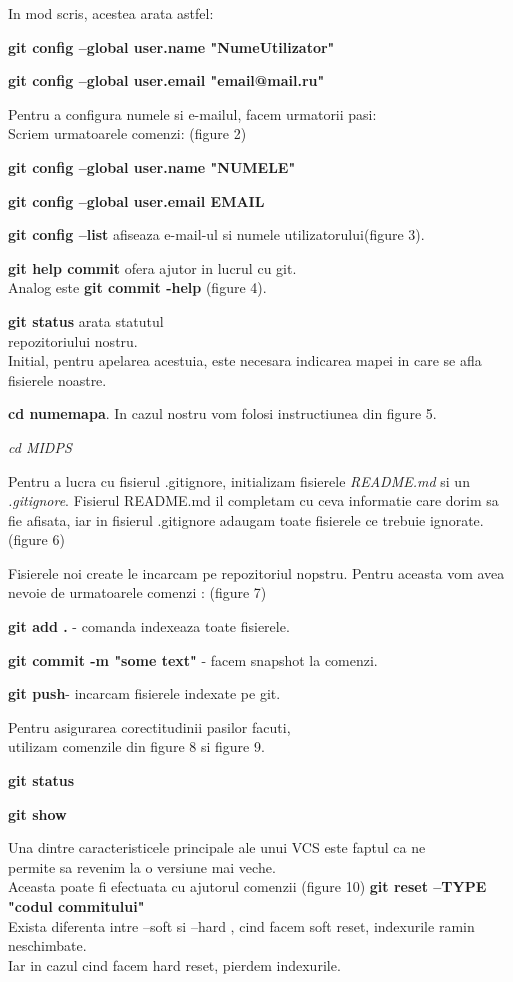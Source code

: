 \documentclass[11pt]{article}
\begin{document}
In mod scris, acestea arata astfel:
\begin{center}
\textbf{git config --global user.name "NumeUtilizator"}

\textbf{git config --global user.email "email@mail.ru"}
\end{center}

Pentru a configura numele si e-mailul, facem urmatorii pasi:
\\Scriem urmatoarele comenzi: (figure 2)

\textbf{git config –global user.name "NUMELE"}

\textbf{git config –global user.email EMAIL}

\textbf{git config --list} afiseaza e-mail-ul si 
numele utilizatorului(figure 3).

\textbf{git help commit} ofera ajutor in lucrul cu git.
\\Analog este \textbf{git commit -help} (figure 4).

\textbf{git status} arata statutul 
\\repozitoriului nostru.
\\Initial, pentru apelarea acestuia, este necesara
indicarea mapei in care se afla fisierele noastre.

\textbf{cd numemapa}.
In cazul nostru vom folosi instructiunea din figure 5.

\textit{cd MIDPS}

Pentru a lucra cu fisierul .gitignore, initializam fisierele
\textit{README.md} si un \textit{.gitignore}. Fisierul README.md il completam
cu ceva informatie care dorim sa fie afisata, iar 
in fisierul .gitignore adaugam toate fisierele ce trebuie ignorate. (figure 6)

Fisierele noi create le incarcam pe repozitoriul nopstru.
Pentru aceasta vom avea nevoie de urmatoarele comenzi : 
(figure 7)

\textbf{git add .} - comanda indexeaza toate fisierele.

\textbf{git commit -m "some text"} - facem snapshot la comenzi.

\textbf{git push}- incarcam fisierele indexate pe git.

Pentru asigurarea corectitudinii pasilor facuti,
\\utilizam comenzile din figure 8 si figure 9.

\textbf{git status}

\textbf{git show}

Una dintre caracteristicele principale ale unui VCS este faptul ca ne
\\permite sa revenim la o versiune mai veche. 
\\Aceasta poate fi efectuata cu ajutorul comenzii (figure 10)
\textbf{git reset –TYPE "codul commitului" }
\\Exista diferenta intre –soft si –hard , cind facem soft reset, 
indexurile ramin neschimbate.
\\Iar in cazul cind facem hard reset, pierdem indexurile.
\end{document}
